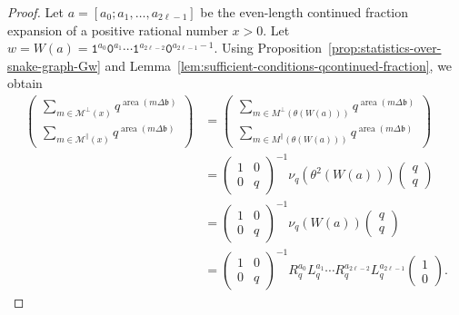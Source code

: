 \documentclass[a4paper,12pt]{amsart}
\newcommand{\xx}{{x}}
\newcommand{\Mcal}{{\mathcal{M}}}
\newcommand{\bfrak}{{\mathfrak{b}}}
\newcommand{\0}{\mathtt{0}}
\newcommand{\1}{\mathtt{1}}
\newcommand{\2}{\mathtt{2}}
\newcommand{\3}{\mathtt{3}}
\newcommand{\carreplein}{{\perp}}
\newcommand{\carrevide}{{\parallel}}
\DeclareMathOperator{\area}{area}
\begin{document}
\begin{proof}
    Let $a=[a_0;a_1,\dots,a_{2\ell-1}]$ be the even-length continued fraction expansion
    of a positive rational number $\xx>0$.
    Let $w=W(a)=\1^{a_0}\0^{a_{1}}\cdots \1^{a_{2\ell-2}}\0^{a_{2\ell-1}-1}$.
    Using Proposition~\ref{prop:statistics-over-snake-graph-Gw}
    and Lemma~\ref{lem:sufficient-conditions-qcontinued-fraction},
    we obtain
    \begin{align*}
    \left(\begin{array}{r}
        \sum_{m\in \Mcal^\carreplein(\xx)} q^{\area(m\Delta\bfrak)}\\
            \sum_{m\in \Mcal^\carrevide (\xx)} q^{\area(m\Delta\bfrak)}
    \end{array}\right)
        &=
    \left(\begin{array}{r}
        \sum_{m\in M^\carreplein(\theta(W(a)))} q^{\area(m\Delta\bfrak)}\\
            \sum_{m\in M^\carrevide (\theta(W(a)))} q^{\area(m\Delta\bfrak)}
    \end{array}\right)\\
        &= \left(\begin{smallmatrix} 1 & 0 \\ 0 & q \end{smallmatrix}\right)^{-1}
                \nu_q(\theta^2(W(a)))
            \left(\begin{smallmatrix} q \\ q \end{smallmatrix}\right)\\
        &= \left(\begin{smallmatrix} 1 & 0 \\ 0 & q \end{smallmatrix}\right)^{-1}
                \nu_q(W(a))
            \left(\begin{smallmatrix} q \\ q \end{smallmatrix}\right)\\
        &=
        \left(\begin{smallmatrix} 1 & 0 \\ 0 & q \end{smallmatrix}\right)^{-1}
        R_q^{a_0}L_q^{a_1}\cdots R_q^{a_{2\ell-2}}L_q^{a_{2\ell-1}}
        \left(\begin{smallmatrix} 1 \\ 0 \end{smallmatrix}\right).
    \end{align*}
\end{proof}
\end{document}
